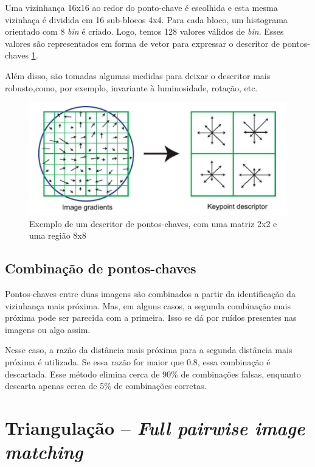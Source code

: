 Uma vizinhança 16x16 ao redor do ponto-chave é escolhida e esta mesma vizinhaça é dividida em 16 sub-blocos 4x4. Para cada bloco, um histograma orientado com 8 {\it bin} é criado. Logo, temos 128 valores válidos de {\it bin}. Esses valores são representados em forma de vetor para expressar o descritor de pontos-chaves \ref{fig:descritorKeypoint}. 

Além disso, são tomadas algumas medidas para deixar o descritor mais robusto,como, por exemplo, invariante à luminosidade, rotação, etc.

\begin{figure} [!h]
	\centering
	\includegraphics[width=0.45\linewidth]{figs/descritorKeypoint.png}
	\caption{%
	Exemplo de um descritor de pontos-chaves, com uma matriz 2x2 e uma região 8x8
	}\label{fig:descritorKeypoint}
\end{figure}

\subsection{Combinação de pontos-chaves}

Pontos-chaves entre duas imagens são combinados a partir da identificação da vizinhança mais próxima. Mas, em alguns casos, a segunda combinação mais próxima pode ser parecida com a primeira. Isso se dá por ruídos presentes nas imagens ou algo assim. 

Nesse caso, a razão da distância mais próxima para a segunda distância mais próxima é utilizada. Se essa razão for maior que 0.8, essa combinação é descartada.
Esse método elimina cerca de 90\% de combinações falsas, enquanto descarta apenas cerca de 5\% de combinações corretas.

\section {Triangulação -- {\it Full pairwise image matching}}